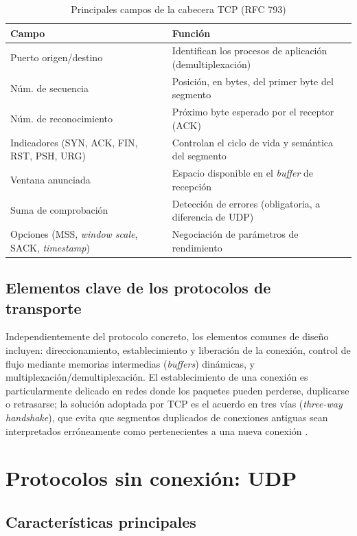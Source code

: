 \documentclass[conference]{IEEEtran}
\begin{document}
\begin{table}[htbp]
\caption{Principales campos de la cabecera TCP (RFC 793)}
\label{tab:tcpheader}
\centering
\begin{tabular}{|p{2.3cm}|p{4.7cm}|}
\hline
\textbf{Campo} & \textbf{Función} \\
\hline
Puerto origen/destino & Identifican los procesos de aplicación (demultiplexación) \\
\hline
Núm. de secuencia & Posición, en bytes, del primer byte del segmento \\
\hline
Núm. de reconocimiento & Próximo byte esperado por el receptor (ACK) \\
\hline
Indicadores (SYN, ACK, FIN, RST, PSH, URG) & Controlan el ciclo de vida y semántica del segmento \\
\hline
Ventana anunciada & Espacio disponible en el \textit{buffer} de recepción \\
\hline
Suma de comprobación & Detección de errores (obligatoria, a diferencia de UDP) \\
\hline
Opciones (MSS, \textit{window scale}, SACK, \textit{timestamp}) & Negociación de parámetros de rendimiento \\
\hline
\end{tabular}
\end{table}

\subsection{Elementos clave de los protocolos de transporte}

Independientemente del protocolo concreto, los elementos comunes de diseño incluyen: direccionamiento, establecimiento y liberación de la conexión, control de flujo mediante memorias intermedias (\textit{buffers}) dinámicas, y multiplexación/demultiplexación. El establecimiento de una conexión es particularmente delicado en redes donde los paquetes pueden perderse, duplicarse o retrasarse; la solución adoptada por TCP es el acuerdo en tres vías (\textit{three-way handshake}), que evita que segmentos duplicados de conexiones antiguas sean interpretados erróneamente como pertenecientes a una nueva conexión \cite{tanenbaum}.

\section{Protocolos sin conexión: UDP}

\subsection{Características principales}
\end{document}
